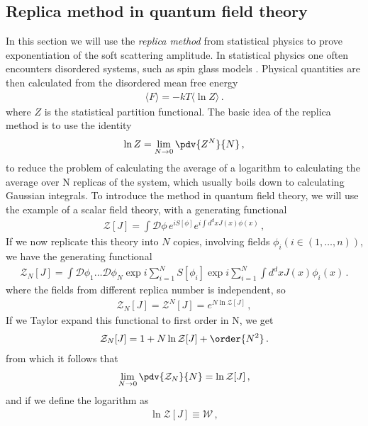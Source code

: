 \subsection{Replica method in quantum field theory}\label{sec:Replica method in QFT}
In this section we will use the \emph{replica method} from statistical physics to prove exponentiation of the soft scattering amplitude. In statistical physics one often encounters disordered systems, such as spin glass models \cite{Mezard:1991tt}. Physical quantities are then calculated from the disordered mean free energy
\begin{align}
    \langle F\rangle=-kT\langle\ln Z \rangle\,.
\end{align}
where $Z$ is the statistical partition functional. The basic idea of the replica method is to use the identity
\begin{align}
    \ln Z=\lim_{N\to 0}\pdv{Z^{N}}{N}\,,
\end{align}
to reduce the problem of calculating the average of a logarithm to calculating the average over N replicas of the system, which usually boils down to calculating Gaussian integrals. To introduce the method in quantum field theory, we will use the example of a scalar field theory, with a generating functional
\begin{align}
    \mathcal{Z}[J]=\int\mathcal{D}\phi\,e^{iS[\phi]}e^{i\int d^{d}x J(x)\phi(x)}\,,
\end{align}
If we now replicate this theory into $N$ copies, involving fields $\phi_{i}(i\in(1,\dots ,n))$, we have the generating functional
\begin{align}
    \mathcal{Z}_{N}[J]=\int\mathcal{D}\phi_{1}\dots\mathcal{D}\phi_{N}\exp{i\sum_{i=1}^{N}S[\phi_i]}\exp{i\sum_{i=1}^{N}\int d^{d}x J(x)\phi_{i}(x)}\,.
\end{align}
where the fields from different replica number is independent, so
\begin{align}
    \mathcal{Z}_{N}[J]=\mathcal{Z}^{N}[J]=e^{N\ln \mathcal{Z}[J]}\,,
\end{align}
If we Taylor expand this functional to first order in N, we get
\begin{align}
    \mathcal{Z}_{N}[J]=1+N\ln\mathcal{Z}[J]+\order{N^{2}}\,.
\end{align}
from which it follows that
\begin{align}
    \lim_{N\to 0}\pdv{\mathcal{Z}_{N}}{N}=\ln\mathcal{Z}[J]\,,
\end{align}
and if we define the logarithm as
\begin{align}
    \ln\mathcal{Z}[J]\equiv \mathcal{W}\,,
\end{align}
